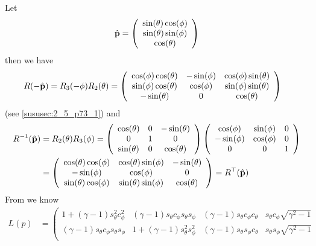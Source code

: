 \begin{widetext}
	Let \[\hat{\mathbf{p}}=\left(\begin{array}{c}
		\sin(\theta)\cos(\phi)\\
		\sin(\theta)\sin(\phi)\\
		\cos(\theta)
	\end{array}\right)\]
	then we have \begin{align*} R(-\hat{\mathbf{p}})&=R_3(-\phi)R_2(\theta)=
		\left(\begin{array}{ccc}
			\cos(\phi)\cos(\theta)	& -\sin(\phi) & \cos(\phi)\sin(\theta) \\
			\sin(\phi)\cos(\theta)	& \cos(\phi) & 	\sin(\phi)\sin(\theta) \\
			-\sin(\theta)	& 0 & \cos(\theta)
		\end{array}\right)\end{align*} (see \ref{sususec:2_5_p73_1}) and 
	\begin{align*} R^{-1}(\hat{\mathbf{p}})&=R_2(\theta)R_3(\phi)=
		\left(\begin{array}{ccc}
			\cos(\theta) & 0 &  -\sin(\theta)\\
			0	& 1 &  0\\
			\sin(\theta)& 0 & \cos(\theta)
		\end{array}\right)
		\left(\begin{array}{ccc}
			\cos(\phi)	& \sin(\phi) & 0 \\
			-\sin(\phi)	& \cos(\phi) & 0 \\
			0	& 0 & 1
		\end{array}\right)\\
		&=\left(\begin{array}{ccc}
			\cos(\theta) \cos(\phi)& \cos(\theta)\sin(\phi) &  -\sin(\theta)\\
			-\sin(\phi)	& \cos(\phi) &  0\\
			\sin(\theta) \cos(\phi)& \sin(\theta)\sin(\phi) & \cos(\theta)
		\end{array}\right)=R^\top (\hat{\mathbf{p}})
	\end{align*}
	From  we know
	\begin{align*} 
		L(p)&=\left(\begin{array}{cccc}
1+(\gamma-1)s_\theta^2c_\phi^2	& (\gamma -1)s_\theta c_\phi s_\theta s_\phi & 	(\gamma -1)s_\theta c_\phi c_\theta & s_\theta c_\phi\sqrt{\gamma^2-1} \\
(\gamma -1)s_\theta c_\phi s_\theta s_\phi&  1+(\gamma-1)s_\theta^2 s_\phi^2& (\gamma -1)s_\theta s_\phi c_\theta & s_\theta s_\phi\sqrt{\gamma^2-1} \\

\end{array}
\end{align*}
\end{widetext}
